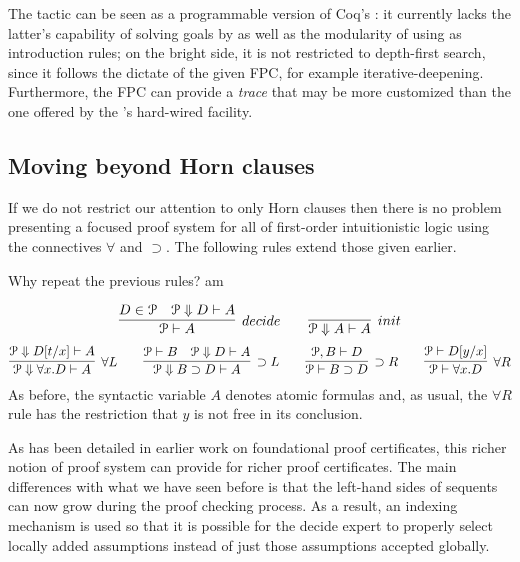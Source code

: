 The  tactic can be seen as a programmable version of
Coq's : it currently lacks the latter's capability of
solving goals by  as well as the modularity of using
 as introduction rules; on the bright side, it is not
restricted to depth-first search, since it follows the dictate of the
given FPC, for example iterative-deepening. Furthermore, the FPC can
provide a \emph{trace} that may be more customized than the one
offered by the 's hard-wired  facility.

\subsection{Moving beyond Horn clauses}
\label{ssec:beyond}

If we do not restrict our attention to only Horn clauses then there is
no problem  presenting a focused proof system for all of
first-order intuitionistic logic using the connectives $\forall$ and
$\supset$.  The following rules extend those given earlier.
\begin{metanote}
  Why repeat the previous rules? am
\end{metanote}
\[
  \infer[decide]{\Pscr\vdash A}{D \in \Pscr\quad \Pscr\Downarrow D\vdash A}
  \qquad
  \infer[init]{\Pscr\Downarrow A\vdash A}{}
\]
\[
  \infer[\forall L]{\Pscr\Downarrow\forall x. D\vdash A}
        {\Pscr\Downarrow D[t/x]\vdash A}
  \qquad
  \infer[\supset L]{\Pscr\Downarrow B\supset D\vdash A}
        {\Pscr\vdash B\quad \Pscr\Downarrow D\vdash A}
  \qquad
  \infer[\supset R]{\Pscr\vdash B\supset D}{\Pscr, B\vdash D}
  \qquad
  \infer[\forall R]{\Pscr\vdash \forall x.D}{\Pscr\vdash D[y/x]}
\]
As before, the syntactic variable $A$ denotes atomic formulas and, as
usual, the $\forall R$ rule has the restriction that $y$ is not free in
its conclusion.

As has been detailed in earlier work on foundational proof
certificates, this richer notion of proof system can provide for
richer proof certificates.  The main differences with what we have
seen before is that the left-hand sides of sequents can now grow
during the proof checking process.  As a result, an indexing mechanism
is used so that it is possible for the decide expert to properly
select locally added assumptions instead of just those assumptions
accepted globally.

